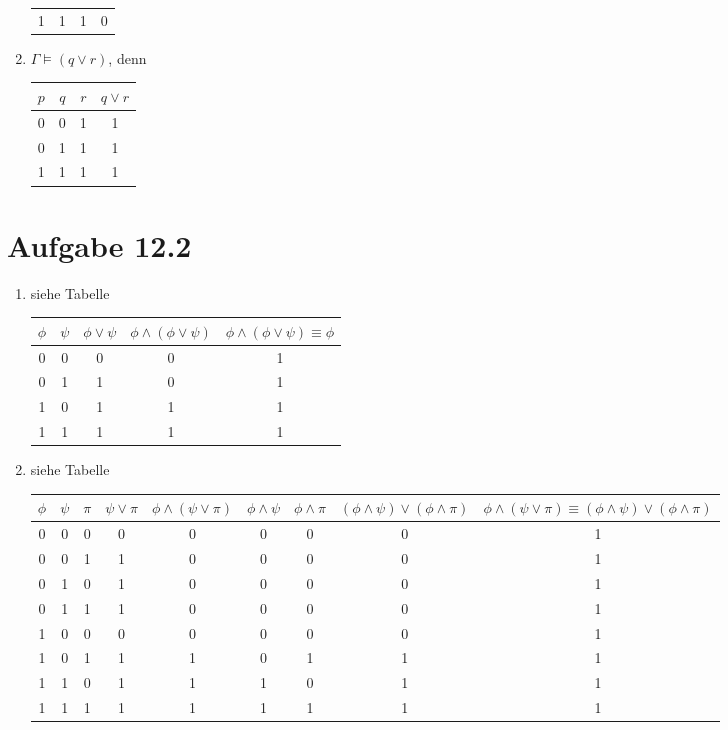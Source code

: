 \documentclass{article}
\begin{document}
\begin{enumerate}[label=(\alph*)]
\begin{center}
\begin{tabular}{ccc||c}
				1 & 1 & 1 & 0 \\
			\end{tabular}
		\end{center}
		\item $\Gamma\models (q\lor r)$, denn
		\begin{center}
			\begin{tabular}{ccc||c}
				$p$ & $q$ & $r$ & $q\lor r$ \\
				\hline
				0 & 0 & 1 & 1 \\
				0 & 1 & 1 & 1 \\
				1 & 1 & 1 & 1 \\
			\end{tabular}
		\end{center}
	\end{enumerate}
	
	\section*{Aufgabe 12.2}
	\begin{enumerate}[label=(\alph*)]
		\item siehe Tabelle
		\begin{center}
			\begin{tabular}{cc||c|c|c}
				$\phi$ & $\psi$ & $\phi\lor\psi$ & $\phi\land(\phi\lor\psi)$ & $\phi\land(\phi\lor\psi)\equiv\phi$ \\
				\hline
				0 & 0 & 0 & 0 & 1 \\
				0 & 1 & 1 & 0 & 1 \\
				1 & 0 & 1 & 1 & 1 \\
				1 & 1 & 1 & 1 & 1 \\
			\end{tabular}
		\end{center}
		\item siehe Tabelle
		\begin{center}
			\begin{tabular}{ccc||c|c|c|c|c|c}
				$\phi$ & $\psi$ & $\pi$ & $\psi\lor\pi$ & $\phi\land(\psi\lor\pi)$ & $\phi\land\psi$ & $\phi\land\pi$ & $(\phi\land\psi)\lor(\phi\land\pi)$ & $\phi\land(\psi\lor\pi)\equiv(\phi\land\psi)\lor(\phi\land\pi)$ \\
				\hline
				0 & 0 & 0 & 0 & 0 & 0 & 0 & 0 & 1 \\
				0 & 0 & 1 & 1 & 0 & 0 & 0 & 0 & 1 \\
				0 & 1 & 0 & 1 & 0 & 0 & 0 & 0 & 1 \\
				0 & 1 & 1 & 1 & 0 & 0 & 0 & 0 & 1 \\
				1 & 0 & 0 & 0 & 0 & 0 & 0 & 0 & 1 \\
				1 & 0 & 1 & 1 & 1 & 0 & 1 & 1 & 1 \\
				1 & 1 & 0 & 1 & 1 & 1 & 0 & 1 & 1 \\
				1 & 1 & 1 & 1 & 1 & 1 & 1 & 1 & 1
			\end{tabular}
		\end{center}
	\end{enumerate}
\end{document}
